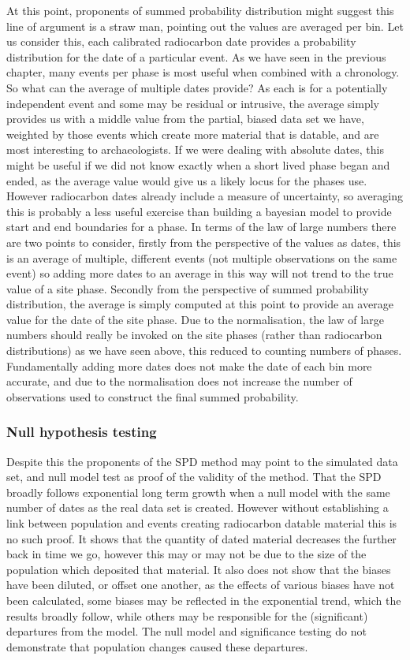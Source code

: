 At this point, proponents of summed probability distribution might suggest this line of argument is a straw man, pointing out the values are averaged per bin. Let us consider this, each calibrated radiocarbon date provides a probability distribution for the date of a particular event. As we have seen in the previous chapter, many events per phase is most useful when combined with a chronology. So what can the average of multiple dates provide? As each is for a potentially independent event and some may be residual or intrusive, the average simply provides us with a middle value from the partial, biased data set we have, weighted by those events which create more material that is datable, and are most interesting to archaeologists. If we were dealing with absolute dates, this might be useful if we did not know exactly when a short lived phase began and ended, as the average value would give us a likely locus for the phases use. However radiocarbon dates already include a measure of uncertainty, so averaging this is probably a less useful exercise than building a bayesian model to provide start and end boundaries for a phase. In terms of the law of large numbers there are two points to consider, firstly from the perspective of the values as dates, this is an average of multiple, different events (not multiple observations on the same event) so adding more dates to an average in this way will not trend to the true value of a site phase. Secondly from the perspective of summed probability distribution, the average is simply computed at this point to provide an average value for the date of the site phase. Due to the normalisation, the law of large numbers should really be invoked on the site phases (rather than radiocarbon distributions) as we have seen above, this reduced to counting numbers of phases. Fundamentally adding more dates does not make the date of each bin more accurate, and due to the normalisation does not increase the number of observations used to construct the final summed probability.

\subsubsection{Null hypothesis testing}
Despite this the proponents of the SPD method may point to the simulated data set, and null model test as proof of the validity of the method. That the SPD broadly follows exponential long term growth \citep{Shennan:2013fk} when a null model with the same number of dates as the real data set is created. However without establishing a link between population and events creating radiocarbon datable material this is no such proof. It shows that the quantity of dated material decreases the further back in time we go, however this may or may not be due to the size of the population which deposited that material. It also does not show that the biases have been diluted, or offset one another, as the effects of various biases have not been calculated, some biases may be reflected in the exponential trend, which the results broadly follow, while others may be responsible for the (significant) departures from the model. The null model and significance testing do not demonstrate that population changes caused these departures.

